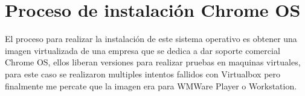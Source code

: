 \documentclass[paper=a4, fontsize=12pt]{article} 		%
\numberwithin{equation}{section}						%
\numberwithin{table}{section} 							%
\begin{document}
\section{Proceso de instalación Chrome OS}
El proceso para realizar la instalación de este sistema operativo es obtener una imagen virtualizada de una empresa que se dedica a dar soporte comercial Chrome OS, ellos liberan versiones para realizar pruebas en maquinas virtuales, para este caso se realizaron multiples intentos fallidos con Virtualbox pero finalmente me percate que la imagen era para WMWare Player o Workstation.
\begin{figure}[H]
 	\centering
       \hfill
\end{figure}
\end{document}
